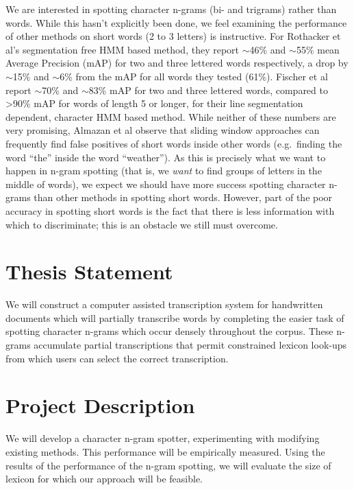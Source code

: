 \documentclass[ms]{byuprop}
\begin{document}
We are interested in spotting character n-grams (bi- and trigrams) rather than words. While this hasn't explicitly been done, we feel examining the performance of other methods on short words (2 to 3 letters) is instructive. For Rothacker et al's\cite{Rothacker2013} segmentation free HMM based method, they report $\sim$46\% and $\sim$55\% mean Average Precision (mAP) for two and three lettered words respectively, a drop by $\sim$15\% and $\sim$6\% from the mAP for all words they tested (61\%). Fischer et al\cite{Fischer2012} report $\sim$70\% and $\sim$83\% mAP for two and three lettered words, compared to {\textgreater}90\% mAP for words of length 5 or longer, for their line segmentation dependent, character HMM based method. While neither of these numbers are very promising, Almazan et al\cite{Almazan2012} observe that sliding window approaches can frequently find false positives of short words inside other words (e.g.~finding the word ``the'' inside the word ``weather''). As this is precisely what we want to happen in n-gram spotting (that is, we \textit{want} to find groups of letters in the middle of words), we expect we should have more success spotting character n-grams than other methods in spotting short words. However, part of the poor accuracy in spotting short words is the fact that there is less information with which to discriminate; this is an obstacle we still must overcome.


\section{Thesis Statement}


We will construct a computer assisted transcription system for handwritten documents which will partially transcribe words by completing the easier task of spotting character n-grams which occur densely throughout the corpus. These n-grams accumulate partial transcriptions that permit constrained lexicon look-ups from which users can select the correct transcription. 

\section{Project Description}

We will develop a character n-gram spotter, experimenting with modifying existing methods.
This performance will be empirically measured. Using the results of the performance of the n-gram spotting, we will evaluate the size of lexicon for which our approach will be feasible.
\end{document}
